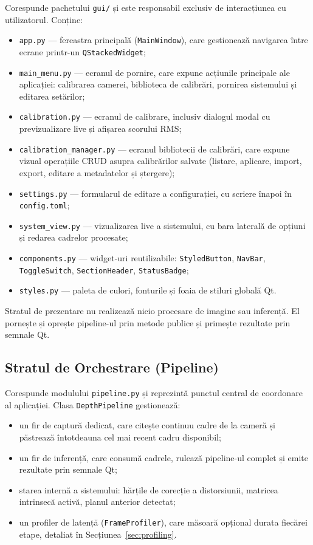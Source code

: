 Corespunde pachetului \texttt{gui/} și este responsabil exclusiv de interacțiunea cu utilizatorul. Conține:
\begin{itemize}
    \item \texttt{app.py} — fereastra principală (\texttt{MainWindow}), care gestionează navigarea între ecrane printr-un \texttt{QStackedWidget};
    \item \texttt{main\_menu.py} — ecranul de pornire, care expune acțiunile principale ale aplicației: calibrarea camerei, biblioteca de calibrări, pornirea sistemului și editarea setărilor;
    \item \texttt{calibration.py} — ecranul de calibrare, inclusiv dialogul modal cu previzualizare live și afișarea scorului RMS;
    \item \texttt{calibration\_manager.py} — ecranul bibliotecii de calibrări, care expune vizual operațiile CRUD asupra calibrărilor salvate (listare, aplicare, import, export, editare a metadatelor și ștergere);
    \item \texttt{settings.py} — formularul de editare a configurației, cu scriere înapoi în \texttt{config.toml};
    \item \texttt{system\_view.py} — vizualizarea live a sistemului, cu bara laterală de opțiuni și redarea cadrelor procesate;
    \item \texttt{components.py} — widget-uri reutilizabile: \texttt{StyledButton}, \texttt{NavBar}, \texttt{ToggleSwitch}, \texttt{SectionHeader}, \texttt{StatusBadge};
    \item \texttt{styles.py} — paleta de culori, fonturile și foaia de stiluri globală Qt.
\end{itemize}

Stratul de prezentare nu realizează nicio procesare de imagine sau inferență. El pornește și oprește pipeline-ul prin metode publice și primește rezultate prin semnale Qt.

\subsection{Stratul de Orchestrare (Pipeline)}

Corespunde modulului \texttt{pipeline.py} și reprezintă punctul central de coordonare al aplicației. Clasa \texttt{DepthPipeline} gestionează:
\begin{itemize}
    \item un fir de captură dedicat, care citește continuu cadre de la cameră și păstrează întotdeauna cel mai recent cadru disponibil;
    \item un fir de inferență, care consumă cadrele, rulează pipeline-ul complet și emite rezultate prin semnale Qt;
    \item starea internă a sistemului: hărțile de corecție a distorsiunii, matricea intrinsecă activă, planul anterior detectat;
    \item un profiler de latență (\texttt{FrameProfiler}), care măsoară opțional durata fiecărei etape, detaliat în Secțiunea~\ref{sec:profiling}.
\end{itemize}

